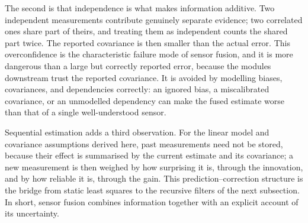 The second is that independence is what makes information additive. Two independent measurements contribute genuinely separate evidence; two correlated ones share part of theirs, and treating them as independent counts the shared part twice. The reported covariance is then smaller than the actual error. This overconfidence is the characteristic failure mode of sensor fusion, and it is more dangerous than a large but correctly reported error, because the modules downstream trust the reported covariance. It is avoided by modelling biases, covariances, and dependencies correctly: an ignored bias, a miscalibrated covariance, or an unmodelled dependency can make the fused estimate worse than that of a single well-understood sensor.

Sequential estimation adds a third observation. For the linear model and covariance assumptions derived here, past measurements need not be stored, because their effect is summarised by the current estimate and its covariance; a new measurement is then weighed by how surprising it is, through the innovation, and by how reliable it is, through the gain. This prediction--correction structure is the bridge from static least squares to the recursive filters of the next subsection.
In short, sensor fusion combines information together with an explicit account of its uncertainty.



